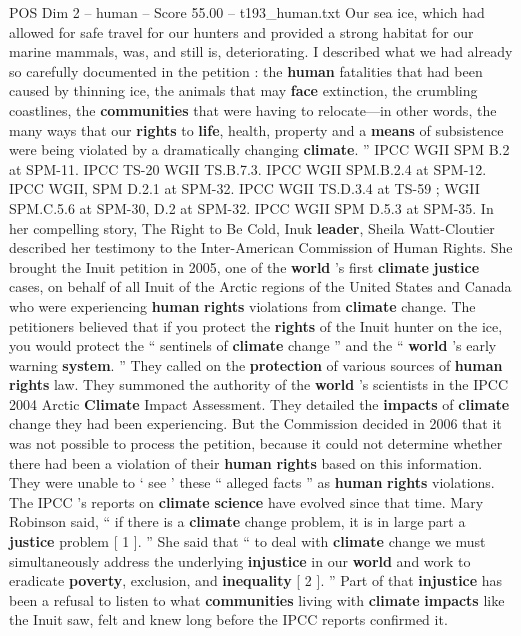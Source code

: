\begin{textsample}{POS Dim 2 – human – Score 55.00 – t193\_human.txt}
Our sea ice, which had allowed for safe travel for our hunters and provided a strong habitat for our marine mammals, was, and still is, deteriorating.
I described what we had already so carefully documented in the petition : the \textbf{human} fatalities that had been caused by thinning ice, the animals that may \textbf{face} extinction, the crumbling coastlines, the \textbf{communities} that were having to relocate—in other words, the many ways that our \textbf{rights} to \textbf{life}, health, property and a \textbf{means} of subsistence were being violated by a dramatically changing \textbf{climate}. ” IPCC WGII SPM B.2 at SPM-11.
IPCC TS-20 WGII TS.B.7.3.
IPCC WGII SPM.B.2.4 at SPM-12.
IPCC WGII, SPM D.2.1 at SPM-32.
IPCC WGII TS.D.3.4 at TS-59 ; WGII SPM.C.5.6 at SPM-30, D.2 at SPM-32.
IPCC WGII SPM D.5.3 at SPM-35.
In her compelling story, The Right to Be Cold, Inuk \textbf{leader}, Sheila Watt-Cloutier described her testimony to the Inter-American Commission of Human Rights.
She brought the Inuit petition in 2005, one of the \textbf{world} ’s first \textbf{climate} \textbf{justice} cases, on behalf of all Inuit of the Arctic regions of the United States and Canada who were experiencing \textbf{human} \textbf{rights} violations from \textbf{climate} change.
The petitioners believed that if you protect the \textbf{rights} of the Inuit hunter on the ice, you would protect the “ sentinels of \textbf{climate} change ” and the “ \textbf{world} ’s early warning \textbf{system}. ” They called on the \textbf{protection} of various sources of \textbf{human} \textbf{rights} law.
They summoned the authority of the \textbf{world} ’s scientists in the IPCC 2004 Arctic \textbf{Climate} Impact Assessment.
They detailed the \textbf{impacts} of \textbf{climate} change they had been experiencing.
But the Commission decided in 2006 that it was not possible to process the petition, because it could not determine whether there had been a violation of their \textbf{human} \textbf{rights} based on this information.
They were unable to ‘ see ’ these “ alleged facts ” as \textbf{human} \textbf{rights} violations.
The IPCC ’s reports on \textbf{climate} \textbf{science} have evolved since that time.
Mary Robinson said, “ if there is a \textbf{climate} change problem, it is in large part a \textbf{justice} problem [ 1 ]. ” She said that “ to deal with \textbf{climate} change we must simultaneously address the underlying \textbf{injustice} in our \textbf{world} and work to eradicate \textbf{poverty}, exclusion, and \textbf{inequality} [ 2 ]. ” Part of that \textbf{injustice} has been a refusal to listen to what \textbf{communities} living with \textbf{climate} \textbf{impacts} like the Inuit saw, felt and knew long before the IPCC reports confirmed it.

\end{textsample}
